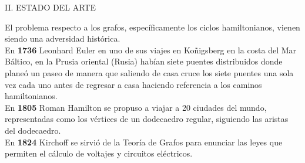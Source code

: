 \documentclass[11pt,a4paper]{article}
\begin{document}
\begin{center}
II. ESTADO DEL ARTE
\end{center}
El problema respecto a los grafos, espec{\'i}ficamente los ciclos hamiltonianos, vienen siendo una adversidad hist{\'o}rica.\\
En \textbf{1736} Leonhard Euler en uno de sus viajes en Koñigsberg en la costa del Mar B{\'a}ltico, en la Prusia oriental (Rusia) hab{\'i}an siete puentes distribuidos donde plane{\'o} un paseo de manera que saliendo de casa cruce los siete puentes una sola vez cada uno antes de regresar a casa haciendo referencia a los caminos hamiltonianos.\\
En \textbf{1805} Roman Hamilton se propuso a viajar a 20 ciudades del mundo, representadas como los v{\'e}rtices de un dodecaedro regular, siguiendo las aristas del dodecaedro.\\
En \textbf{1824} Kirchoff se sirvi{\'o} de la Teor{\'i}a de Grafos para enunciar las leyes que permiten el c{\'a}lculo de voltajes y circuitos el{\'e}ctricos.
\end{document}
